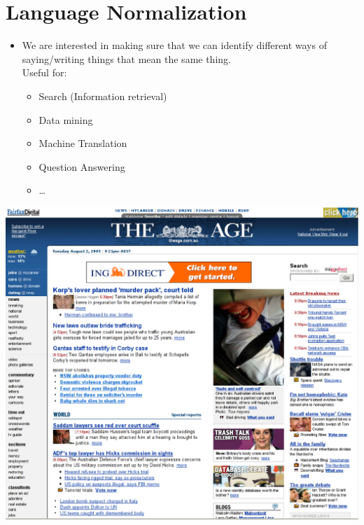 \documentclass[a4paper,landscape,headrule,footrule,xetex]{foils}
\begin{document}
\section{Language Normalization}


\begin{itemize}
\item We are interested in making sure that we can identify different
  ways of saying/writing things that mean the same thing.
  \\ Useful for:
  \begin{itemize}
  \item Search (Information retrieval)
  \item Data mining
  \item Machine Translation
  \item Question Answering
  \item \ldots
  \end{itemize}
\end{itemize}




\begin{center}
  \includegraphics[height=0.95\textheight]{../pics/firefox.eps}
\end{center}
\end{document}
